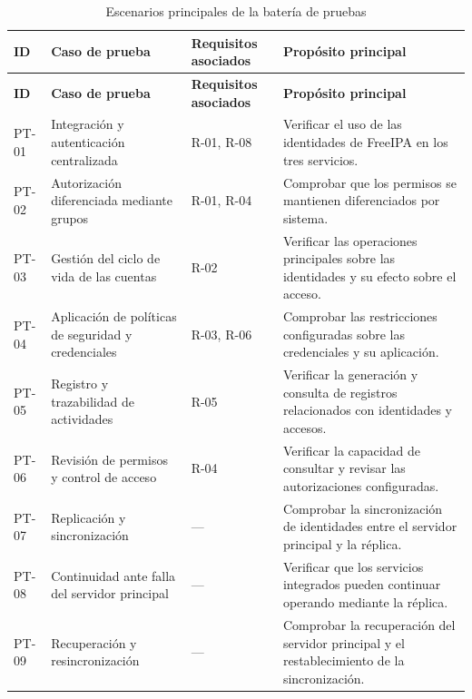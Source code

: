\begingroup
\fontsize{8.5pt}{9.5pt}\selectfont
\renewcommand{\arraystretch}{1.3}
\setlength{\tabcolsep}{4pt}

\begin{longtable}{|
	>{\raggedright\arraybackslash}p{1.5cm}|
	>{\raggedright\arraybackslash}p{4.0cm}|
	>{\raggedright\arraybackslash}p{2.5cm}|
	>{\raggedright\arraybackslash}p{5.5cm}|}

	\caption{Escenarios principales de la batería de pruebas}
	\label{tab:bateria-pruebas}
	\\
	\hline
	\tableheader
	\textbf{ID}                   &
	\textbf{Caso de prueba}       &
	\textbf{Requisitos asociados} &
	\textbf{Propósito principal}
	\\
	\hline
	\endfirsthead

	\hline
	\tableheader
	\textbf{ID}                   &
	\textbf{Caso de prueba}       &
	\textbf{Requisitos asociados} &
	\textbf{Propósito principal}
	\\
	\hline
	\endhead

	PT-01                         & Integración y autenticación centralizada            & R-01, R-08 & Verificar el uso de las identidades de FreeIPA en los tres servicios.                        \\ \hline
	PT-02                         & Autorización diferenciada mediante grupos           & R-01, R-04 & Comprobar que los permisos se mantienen diferenciados por sistema.                           \\ \hline
	PT-03                         & Gestión del ciclo de vida de las cuentas            & R-02       & Verificar las operaciones principales sobre las identidades y su efecto sobre el acceso.     \\ \hline
	PT-04                         & Aplicación de políticas de seguridad y credenciales & R-03, R-06 & Comprobar las restricciones configuradas sobre las credenciales y su aplicación.             \\ \hline
	PT-05                         & Registro y trazabilidad de actividades              & R-05       & Verificar la generación y consulta de registros relacionados con identidades y accesos.      \\ \hline
	PT-06                         & Revisión de permisos y control de acceso            & R-04       & Verificar la capacidad de consultar y revisar las autorizaciones configuradas.               \\ \hline
	PT-07                         & Replicación y sincronización                        & ---        & Comprobar la sincronización de identidades entre el servidor principal y la réplica.         \\ \hline
	PT-08                         & Continuidad ante falla del servidor principal       & ---        & Verificar que los servicios integrados pueden continuar operando mediante la réplica.        \\ \hline
	PT-09                         & Recuperación y resincronización                     & ---        & Comprobar la recuperación del servidor principal y el restablecimiento de la sincronización. \\ \hline
\end{longtable}
\endgroup
\normalsize
